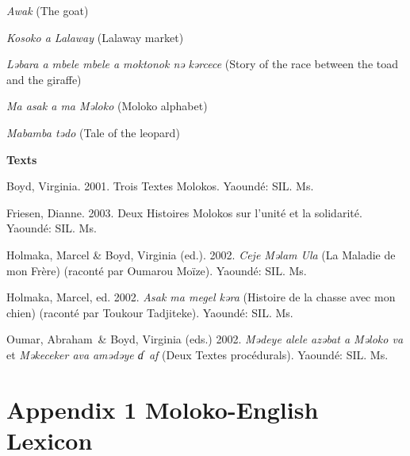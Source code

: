 \textit{Awak} (The goat)

\textit{Kosoko a Lalaway} (Lalaway market)

\textit{Ləbara a mbele mbele a moktonok nə}\textit{ kərcece} (Story of the race between the toad and the giraffe)

\textit{Ma asak a ma Məloko }(Moloko alphabet)

\textit{Mabamba tədo} (Tale of the leopard)

\textbf{Texts}

Boyd, Virginia.  2001.  Trois Textes Molokos.  Yaoundé:  SIL. Ms.

Friesen, Dianne.  2003.  Deux Histoires Molokos sur l’unité et la solidarité.  Yaoundé:  SIL. Ms.

Holmaka, Marcel \& Boyd, Virginia (ed.).  2002.  \textit{Ceje M}\textit{ə}\textit{lam Ula} (La Maladie de mon Frère) (raconté par Oumarou Moïze).  Yaoundé: SIL. Ms.  

Holmaka, Marcel, ed.  2002.  \textit{Asak ma megel k}\textit{ə}\textit{ra }(Histoire de la chasse avec mon chien) (raconté par Toukour Tadjiteke). Yaoundé: SIL. Ms.

Oumar, Abraham~\& Boyd, Virginia (eds.)  2002.  \textit{M}\textit{ə}\textit{deye alele az}\textit{ə}\textit{bat a M}\textit{ə}\textit{loko va }et \textit{M}\textit{ə}\textit{keceker ava }\textit{amədəye ɗ}\textit{~af} (Deux Textes procédurals).  Yaoundé:  SIL. Ms.

\setcounter{page}{1}\chapter[Appendix 1 Moloko{}-English Lexicon]{Appendix 1 Moloko-English Lexicon}
\hypertarget{RefHeading1213661525720847}{}\begin{multicols}{2}

\thepage{}

\end{multicols}
\begin{styleLetterParagraph}
\end{styleLetterParagraph}

